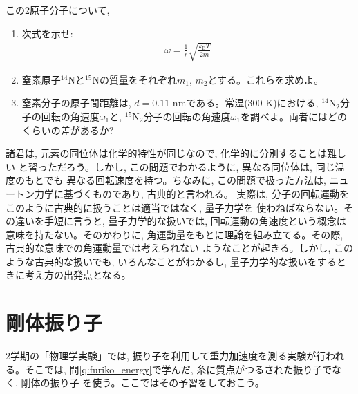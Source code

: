 %
\begin{q}\label{q:mominert_molecule}
この2原子分子について, 
\begin{enumerate}
\item 次式を示せ:
\begin{eqnarray}
\omega=\frac{1}{r}\sqrt{\frac{k_{\text{B}}T}{2m}}\label{eq:2atommolrot3}
\end{eqnarray}
\item 窒素原子$^{14}$Nと$^{15}$Nの質量をそれぞれ$m_1$, $m_2$とする。これらを求めよ。
\item 窒素分子の原子間距離は, $d=0.11\text{ nm}$である。常温(300 K)における, 
$^{14}$N$_2$分子の回転の角速度$\omega_1$と, 
$^{15}$N$_2$分子の回転の角速度$\omega_1$を調べよ。両者にはどのくらいの差があるか?
\end{enumerate}

諸君は, 元素の同位体は化学的特性が同じなので, 化学的に分別することは難しい
と習っただろう。しかし, この問題でわかるように, 異なる同位体は, 同じ温度のもとでも
異なる回転速度を持つ。ちなみに, この問題で扱った方法は, ニュートン力学に基づくものであり, 古典的と言われる。
実際は, 分子の回転運動をこのように古典的に扱うことは適当ではなく, 量子力学を
使わねばならない。その違いを手短に言うと, 量子力学的な扱いでは, 
回転運動の角速度という概念は意味を持たない。そのかわりに, 
角運動量をもとに理論を組み立てる。その際, 古典的な意味での角運動量では考えられない
ようなことが起きる。しかし, このような古典的な扱いでも, いろんなことがわかるし, 
量子力学的な扱いをするときに考え方の出発点となる。
\hv

\section{剛体振り子}

2学期の「物理学実験」では, 振り子を利用して重力加速度を測る実験が行われる。そこでは, 
問\ref{q:furiko_energy}で学んだ, 糸に質点がつるされた振り子でなく, 剛体の振り子
を使う。ここではその予習をしておこう。\mv


\end{q}
